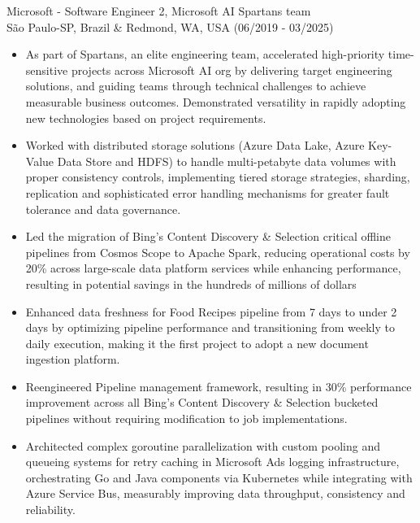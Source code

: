 
\normalsize{Microsoft - Software Engineer 2, Microsoft AI Spartans team}\\
    \scriptsize{São Paulo-SP, Brazil \& Redmond, WA, USA (06/2019 - 03/2025)}
\begin{itemize}
    \item \scriptsize{As part of Spartans, an elite engineering team, accelerated high-priority
        time-sensitive projects across Microsoft AI org by delivering target engineering solutions, and
        guiding teams through technical challenges to achieve measurable business outcomes. Demonstrated
        versatility in rapidly adopting new technologies based on project requirements.}

    \item \scriptsize{Worked with distributed storage solutions (Azure Data Lake, Azure Key-Value Data
        Store and HDFS) to handle multi-petabyte data volumes with proper consistency controls,
        implementing tiered storage strategies, sharding, replication and sophisticated error handling
        mechanisms for greater fault tolerance and data governance.}

    \item \scriptsize{Led the migration of Bing's Content Discovery \& Selection critical offline
        pipelines from Cosmos Scope to Apache Spark, reducing operational costs by 20\% across
        large-scale data platform services while enhancing performance, resulting in potential savings
        in the hundreds of millions of dollars}

    \item \scriptsize{Enhanced data freshness for Food Recipes pipeline from 7 days to under 2 days by
        optimizing pipeline performance and transitioning from weekly to daily execution, making it the
        first project to adopt a new document ingestion platform.}

    \item \scriptsize{Reengineered Pipeline management framework, resulting in 30\% performance
        improvement across all Bing's Content Discovery \& Selection bucketed pipelines without
        requiring modification to job implementations.}

    \item \scriptsize{Architected complex goroutine parallelization with custom pooling and queueing
        systems for retry caching in Microsoft Ads logging infrastructure, orchestrating Go and Java
        components via Kubernetes while integrating with Azure Service Bus, measurably improving data
        throughput, consistency and reliability.}
    

\end{itemize}
